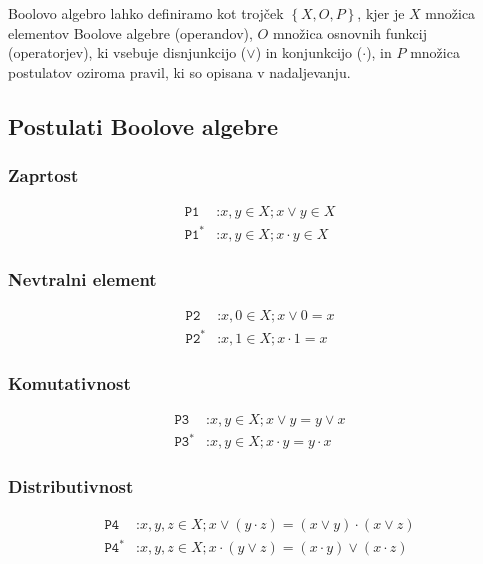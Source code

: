 Boolovo algebro lahko definiramo kot trojček $\left\{X, O, P\right\}$, kjer je $X$ množica elementov Boolove algebre (operandov), $O$ množica osnovnih funkcij (operatorjev), ki vsebuje disnjunkcijo ($\vee$) in konjunkcijo ($\cdot$), in $P$ množica postulatov oziroma pravil, ki so opisana v nadaljevanju.

\subsection{Postulati Boolove algebre}
\subsubsection*{Zaprtost}
\begin{align*}
\texttt{P1}&\texttt{:}x,y \in X; x \vee y \in X\\
\texttt{P1}^*&\texttt{:}x,y \in X; x \cdot y \in X
\end{align*}

\subsubsection*{Nevtralni element}
\begin{align*}
\texttt{P2}&\texttt{:}x,0 \in X; x \vee 0 = x\\
\texttt{P2}^*&\texttt{:}x,1 \in X; x \cdot 1 = x
\end{align*}

\subsubsection*{Komutativnost}
\begin{align*}
\texttt{P3}&\texttt{:}x,y \in X; x \vee y = y \vee x\\
\texttt{P3}^*&\texttt{:}x,y \in X; x \cdot y = y \cdot x
\end{align*}

\subsubsection*{Distributivnost}
\begin{align*}
\texttt{P4}&\texttt{:}x,y,z \in X; x \vee \left(y \cdot z \right) = \left(x \vee y\right) \cdot \left( x \vee z\right)\\
\texttt{P4}^*&\texttt{:}x,y,z \in X; x \cdot \left(y \vee z \right) = \left(x \cdot y\right) \vee \left( x \cdot z\right)
\end{align*}

